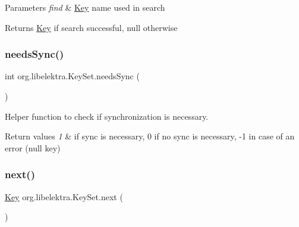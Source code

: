 \begin{DoxyParams}{Parameters}
{\em find} & \mbox{\hyperlink{classorg_1_1libelektra_1_1Key}{Key}} name used in search \\
\hline
\end{DoxyParams}
\begin{DoxyReturn}{Returns}
\mbox{\hyperlink{classorg_1_1libelektra_1_1Key}{Key}} if search successful, null otherwise 
\end{DoxyReturn}
\mbox{\label{classorg_1_1libelektra_1_1KeySet_a9a21c729da19bc6fb2e7f33fe06ee15e}} 
\subsubsection{\texorpdfstring{needsSync()}{needsSync()}}
{\footnotesize\ttfamily int org.\+libelektra.\+Key\+Set.\+needs\+Sync (\begin{DoxyParamCaption}{ }\end{DoxyParamCaption})\hspace{0.3cm}{\ttfamily [inline]}}



Helper function to check if synchronization is necessary. 


\begin{DoxyRetVals}{Return values}
{\em 1} & if sync is necessary, 0 if no sync is necessary, -\/1 in case of an error (null key) \\
\hline
\end{DoxyRetVals}
\mbox{\label{classorg_1_1libelektra_1_1KeySet_a92aa593320132e4272602dda29aee2c7}} 
\subsubsection{\texorpdfstring{next()}{next()}}
{\footnotesize\ttfamily \mbox{\hyperlink{classorg_1_1libelektra_1_1Key}{Key}} org.\+libelektra.\+Key\+Set.\+next (\begin{DoxyParamCaption}{ }\end{DoxyParamCaption})\hspace{0.3cm}{\ttfamily [inline]}}




